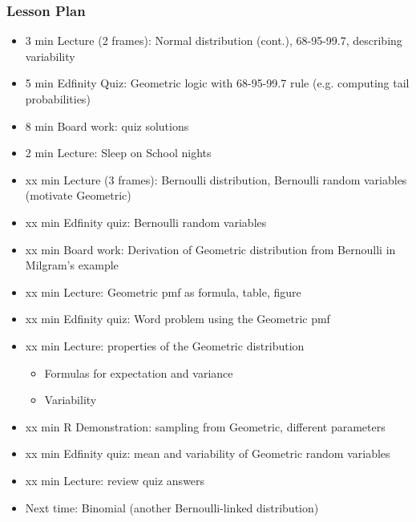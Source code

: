 \begin{frame}
    \frametitle{Lesson Plan}
    \begin{itemize}
        \item 3 min Lecture (2 frames): Normal distribution (cont.), 68-95-99.7, describing variability
        \item 5 min Edfinity Quiz: Geometric logic with 68-95-99.7 rule (e.g. computing tail probabilities)
        \item 8 min Board work: quiz solutions
        \item 2 min Lecture: Sleep on School nights

        \item xx min Lecture (3 frames): Bernoulli distribution, Bernoulli random variables (motivate Geometric)
        \item xx min Edfinity quiz: Bernoulli random variables
        \item xx min Board work: Derivation of Geometric distribution from Bernoulli in Milgram's example
        \item xx min Lecture: Geometric pmf as formula, table, figure
        \item xx min Edfinity quiz: Word problem using the Geometric pmf
        \item xx min Lecture: properties of the Geometric distribution
        \begin{itemize}
            \item Formulas for expectation and variance
            \item Variability
        \end{itemize}
        \item xx min R Demonstration: sampling from Geometric, different parameters
        \item xx min Edfinity quiz: mean and variability of Geometric random variables
        \item xx min Lecture: review quiz answers
        \item Next time: Binomial (another Bernoulli-linked distribution)
    \end{itemize}
\end{frame}

